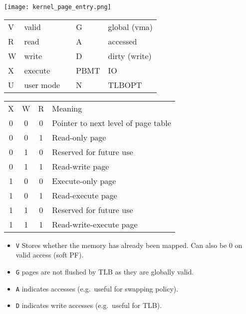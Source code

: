 
\begin{center}
    \texttt{[image: kernel\_page\_entry.png]}
\end{center}

\renewcommand{\arraystretch}{1.3}
\setlength{\oldtabcolsep}{\tabcolsep}\setlength\tabcolsep{6pt}

\begin{tabularx}{\linewidth}{@{}llcll@{}}
    V & valid     &  & G    & global (vma)  \\
    R & read      &  & A    & accessed      \\
    W & write     &  & D    & dirty (write) \\
    X & execute   &  & PBMT & IO            \\
    U & user mode &  & N    & TLBOPT
\end{tabularx}

\begin{tabularx}{\linewidth}{@{}cccl@{}}
    X & W & R & Meaning                             \\
    \cmidrule{1-4}
    0 & 0 & 0 & Pointer to next level of page table \\
    0 & 0 & 1 & Read-only page                      \\
    0 & 1 & 0 & Reserved for future use             \\
    0 & 1 & 1 & Read-write page                     \\
    1 & 0 & 0 & Execute-only page                   \\
    1 & 0 & 1 & Read-execute page                   \\
    1 & 1 & 0 & Reserved for future use             \\
    1 & 1 & 1 & Read-write-execute page
\end{tabularx}

\renewcommand{\arraystretch}{1}
\setlength\tabcolsep{\oldtabcolsep}

\begin{itemize}
    \item \texttt{V} Stores whether the memory has already been mapped. Can also be $0$ on valid access (soft PF).
    \item \texttt{G} pages are not flushed by TLB as they are globally valid.
    \item \texttt{A} indicates accesses (e.g.\ useful for swapping policy).
    \item \texttt{D} indicates write accesses (e.g.\ useful for TLB).
\end{itemize}


